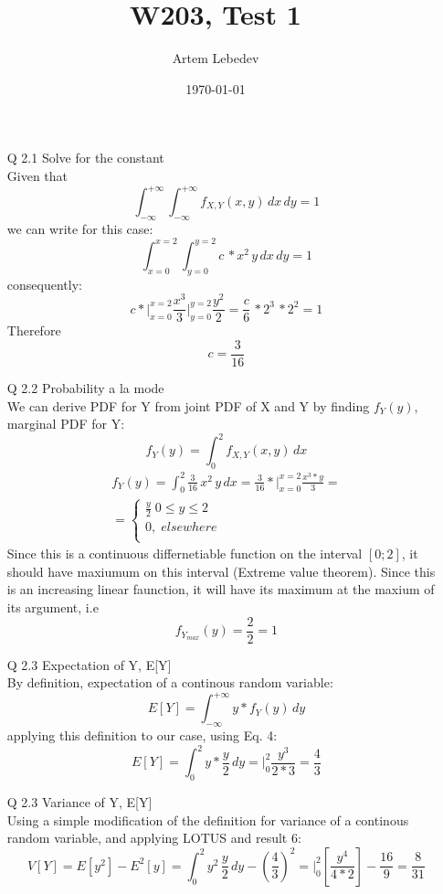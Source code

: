 \documentclass{article}
\author{Artem Lebedev}
\title{W203, Test 1}
\date{\today}
\begin{document}
\maketitle

\begin{enumerate}
\item[Q 2.1] Solve for the constant\\
	Given that
	\begin{equation}
		\int_{-\infty}^{+\infty} \int_{-\infty}^{+\infty}f_{X,Y}(x,y) \,dx\,dy = 1
	\end{equation}
	we can write for this case:
	\begin{equation}
		\int_{x=0}^{x=2} \int_{y=0}^{y=2}c\,*x^2\,y \,dx\,dy = 1
	\end{equation}
	consequently:
	\begin{equation}
		c*\Big|_{x=0}^{x=2} \frac{x^3}{3}\Big|_{y=0}^{y=2}\frac{y^2}{2} = 
		\frac{c}{6}\,*2^3\,*2^2 = 1
	\end{equation}
	Therefore $$c = \frac{3}{16}$$
\item[Q 2.2] Probability a la mode\\
	We can derive PDF for Y from joint PDF of X and Y by finding $f_Y(y)$, marginal PDF for Y:
	\begin{equation}
		f_Y(y) = \int_{0}^{2}f_{X,Y}(x,y)\,dx
	\end{equation}
	\begin{align*}
		f_Y(y) = \int_{0}^{2}\frac{3}{16}\,x^2\,y\,dx=\frac{3}{16}*\Big|_{x=0}^{x=2}\frac{x^3*y}{3}=\\
		= 	\begin{cases}
				\frac{y}{2}\;0\leq y \leq2\\
				0,\; elsewhere\\
			\end{cases}
	\end{align*}
	Since this is a continuous differnetiable function on the interval $[0;2]$, it should have maxiumum on this interval (Extreme value theorem). Since this is an increasing linear faunction, it will have its maximum at the maxium of its argument, i.e $$f_{Y_{max}}(y) = \frac{2}{2} = 1$$
\item[Q 2.3] Expectation of Y, E[Y]\\
	By definition, expectation of a continous random variable:
	\begin{equation}
		E[Y] = \int_{-\infty}^{+\infty}y*f_Y(y)\,dy
	\end{equation}
	applying this definition to our case, using Eq. 4:
	\begin{equation}
		E[Y] = \int_{0}^{2}y*\frac{y}{2}\,dy = \Big|_0^2\frac{y^3}{2*3} = \frac{4}{3}
	\end{equation}
\item[Q 2.3] Variance of Y, E[Y]\\
	Using a simple modification of the definition for variance of a continous random variable, and applying LOTUS and result 6:
	\begin{equation}
		V[Y] = E[y^2]-E^2[y] = \int_{0}^{2}y^2\,\frac{y}{2}\,dy - \left(\frac{4}{3}\right)^2 = \Big|_0^2\left[\frac{y^4}{4*2}\right] - \frac{16}{9} = \frac{8}{31}
	\end{equation}

\end{enumerate}
\end{document}

